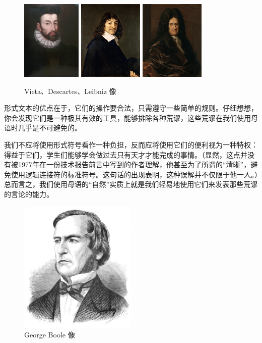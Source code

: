 \documentclass[a4paper,12pt]{article}
\begin{document}
\begin{figure}[ht]
    \centering
    \includegraphics[height=1.5in]{images/Francois_Viete.jpeg}
    \includegraphics[height=1.5in]{images/Descartes.jpeg}
    \includegraphics[height=1.5in]{images/Leibniz.jpeg}
    \caption{Vieta、Descartes、Leibniz 像}
\end{figure}

形式文本的优点在于，它们的操作要合法，只需遵守一些简单的规则。仔细想想，你会发现它们是一种极其有效的工具，能够排除各种荒谬，这些荒谬在我们使用母语时几乎是不可避免的。

我们不应将使用形式符号看作一种负担，反而应将使用它们的便利视为一种特权：得益于它们，学生们能够学会做过去只有天才才能完成的事情。（显然，这点并没有被1977年在一份技术报告前言中写到的作者理解，他甚至为了所谓的“清晰”，避免使用逻辑连接符的标准符号。这句话的出现表明，这种误解并不仅限于他一人。）总而言之，我们使用母语的“自然”实质上就是我们轻易地使用它们来发表那些荒谬的言论的能力。

\begin{figure}[ht]
    \centering
    \includegraphics[height=2.5in]{images/George_Boole.jpeg}
    \caption{George Boole 像}
\end{figure}
\end{document}

